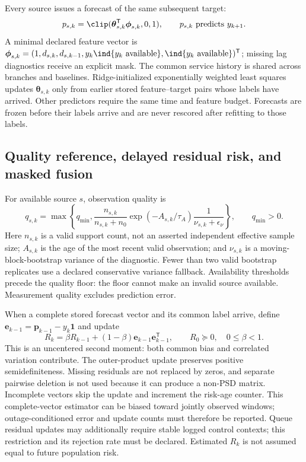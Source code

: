 Every source issues a forecast of the same subsequent target:
\begin{equation}
 p_{s,k}=\clip(\boldsymbol\theta_{s,k}^{\mathsf T}\boldsymbol\phi_{s,k},0,1),
 \qquad p_{s,k}\ \text{predicts }y_{k+1}.
 \label{eq:common-forecast}
\end{equation}
A minimal declared feature vector is
$\boldsymbol\phi_{s,k}=(1,d_{s,k},d_{s,k-1},y_k\ind\{y_k\text{ available}\},
\ind\{y_k\text{ available}\})^{\mathsf T}$; missing lag diagnostics receive
an explicit mask. The common service history is shared across branches and
baselines. Ridge-initialized exponentially weighted least squares updates
$\boldsymbol\theta_{s,k}$ only from earlier stored feature--target pairs whose
labels have arrived. Other predictors require the same time and feature budget.
Forecasts are frozen before their labels arrive and are never rescored after
refitting to those labels.

\subsection{Quality reference, delayed residual risk, and masked fusion}
\label{sec:reliability}

For available source $s$, observation quality is
\begin{equation}
 q_{s,k}=\max\left\{q_{\min},
 \frac{n_{s,k}}{n_{s,k}+n_0}
 \exp(-A_{s,k}/\tau_A)\frac1{\nu_{s,k}+\epsilon_\nu}\right\},
 \qquad q_{\min}>0.
 \label{eq:quality-only}
\end{equation}
Here $n_{s,k}$ is a valid support count, not an asserted independent effective
sample size; $A_{s,k}$ is the age of the most recent valid observation; and
$\nu_{s,k}$ is a moving-block-bootstrap variance of the diagnostic. Fewer than
two valid bootstrap replicates use a declared conservative variance fallback.
Availability thresholds precede the quality floor: the floor cannot make an
invalid source available. Measurement quality excludes prediction error.

When a complete stored forecast vector and its common label arrive, define
$\boldsymbol e_{k-1}=\boldsymbol p_{k-1}-y_k\boldsymbol1$ and update
\begin{equation}
 R_k=\beta R_{k-1}+(1-\beta)
             \boldsymbol e_{k-1}\boldsymbol e_{k-1}^{\mathsf T},
 \qquad R_0\succeq0,\quad0\le\beta<1.
 \label{eq:residual-update}
\end{equation}
This is an uncentered second moment: both common bias and correlated variation
contribute. The outer-product update preserves positive semidefiniteness.
Missing residuals are not replaced by zeros, and separate pairwise deletion is
not used because it can produce a non-PSD matrix. Incomplete vectors skip the
update and increment the risk-age counter. This complete-vector estimator can
be biased toward jointly observed windows; outage-conditioned error and update
counts must therefore be reported. Queue residual updates may additionally
require stable logged control contexts; this restriction and its rejection
rate must be declared. Estimated $R_k$ is not assumed equal to future population
risk.

